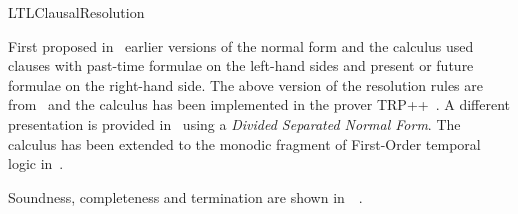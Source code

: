 \begin{entry}{LTLClausalResolution}
\begin{history}
First proposed in~\cite{Fis90-resolve} earlier versions of 
the normal form and the calculus used clauses with past-time formulae
on the left-hand sides and present or future formulae on the
right-hand side. The above version of the resolution rules are
from~\cite{FDP01} and the calculus has been implemented in the prover
TRP++~\cite{HustadtKonev2003a}. 
A different presentation is provided in~\cite{DFK02}
using a {\em Divided Separated Normal Form}.
The calculus has been extended to the monodic fragment of First-Order 
temporal logic in~.
\end{history}

\begin{technicalities}
Soundness, completeness and termination are shown in~~\cite{FDP01}.
\end{technicalities}



%
%
%
%
%
%
% 
%




\end{entry}
